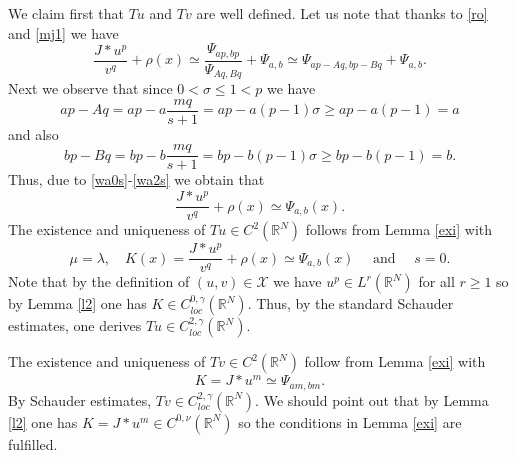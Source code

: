 \documentclass[leqno,12pt]{article}
\newcommand{\R}{\mathbb R}
\numberwithin{equation}{section}
\begin{document}
We claim first that $Tu$ and $Tv$ are well defined. Let us note that thanks to 
\eqref{ro} and \eqref{mj1} we have
\begin{equation}\label{wa0s}
\frac{J * u^p}{v^q}+\rho(x)\simeq \frac{\Psi_{ap, bp}}{\Psi_{Aq,Bq}}+\Psi_{a,b}\simeq \Psi_{ap-Aq, bp-Bq}+\Psi_{a,b}.
\end{equation}
Next we observe that since $0<\sigma\leq 1< p$ we have 
\begin{equation}\label{wa1s}
ap-Aq=ap-a\frac{mq}{s+1}=ap-a(p-1)\sigma\geq ap-a(p-1)=a
\end{equation}
and also
\begin{equation}\label{wa2s}
bp-Bq=bp-b\frac{mq}{s+1}=bp-b(p-1)\sigma\geq bp-b(p-1)=b.
\end{equation} 
Thus, due to \eqref{wa0s}-\eqref{wa2s} we obtain that
$$
\frac{J * u^p}{v^q}+\rho(x)\simeq \Psi_{a,b}(x).
$$
The existence and uniqueness of $Tu\in C^{2}(\R^N)$ follows from 
Lemma \ref{exi} with 
$$
\mu=\lambda, \quad K(x)=\frac{J * u^p}{v^q}+\rho(x)\simeq \Psi_{a,b}(x)\quad\mbox{  and }\quad s=0.
$$ 
Note that by the definition of $(u, v)\in \mathscr{X}$ we have $u^p\in L^r(\R^N)$ for all $r\geq 1$ so by Lemma \ref{l2} one has $K\in C^{0, \gamma}_{loc}(\R^N)$. Thus, by the standard Schauder estimates, one derives $Tu\in C^{2, \gamma}_{loc}(\R^N)$. 

The existence and uniqueness of $Tv\in C^{2}(\R^N)$ follow from
Lemma \ref{exi} with 
$$
K=J * u^m\simeq \Psi_{am,bm}.
$$ 
By Schauder estimates, $Tv\in C^{2,\gamma}_{loc}(\R^N)$. 
We should point out that by Lemma \ref{l2} one has $K=J * u^m\in C^{0, \nu}(\R^N)$ so the conditions in Lemma \ref{exi} are fulfilled.
\end{document}
